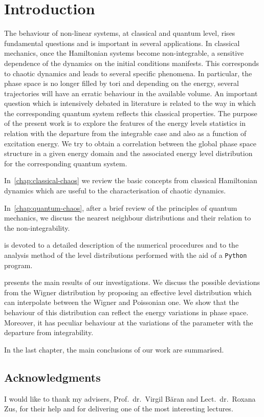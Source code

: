\documentclass[../thesis.tex]{subfiles}
\begin{document}
\chapter*{Introduction}

The behaviour of non-linear systems, at classical and quantum level, rises
fundamental questions and is important in several applications.
In classical mechanics, once the Hamiltonian systems become non-integrable,
a sensitive dependence of the dynamics on the initial conditions manifests.
This corresponds to chaotic dynamics and leads to several specific phenomena.
In particular, the phase space is no longer filled by tori and depending on the
energy, several trajectories will have an erratic behaviour in the available volume.
An important question which is intensively debated in literature is related to
the way in which the corresponding quantum system reflects this classical properties.
The purpose of the present work is to explore the features of the energy levels
statistics in relation with the departure from the integrable case and also as
a function of excitation energy. We try to obtain a correlation between the
global phase space structure in a given energy domain and the associated
energy level distribution for the corresponding quantum system.

In~\cref{chap:classical-chaos} we review the basic concepts from classical
Hamiltonian dynamics which are useful to the characterisation of chaotic dynamics.

In~\cref{chap:quantum-chaos}, after a brief review of the principles of quantum mechanics,
we discuss the nearest neighbour distributions and their relation to the
non-integrability.

 is devoted to a detailed description of the numerical procedures
and to the analysis method of the level distributions performed with the aid of a
\texttt{Python} program.

 presents the main results of our investigations.
We discuss the possible deviations from the Wigner distribution by proposing an
effective level distribution which can interpolate between the Wigner and Poissonian one.
We show that the behaviour of this distribution can reflect the energy variations
in phase space. Moreover, it has peculiar behaviour at the variations of the parameter
with the departure from integrability.

In the last chapter, the main conclusions of our work are summarised.

\section*{Acknowledgments}
I would like to thank my advisers, Prof.~dr.~Virgil Băran and Lect.~dr.~Roxana Zus,
for their help and for delivering one of the most interesting lectures.
\end{document}

